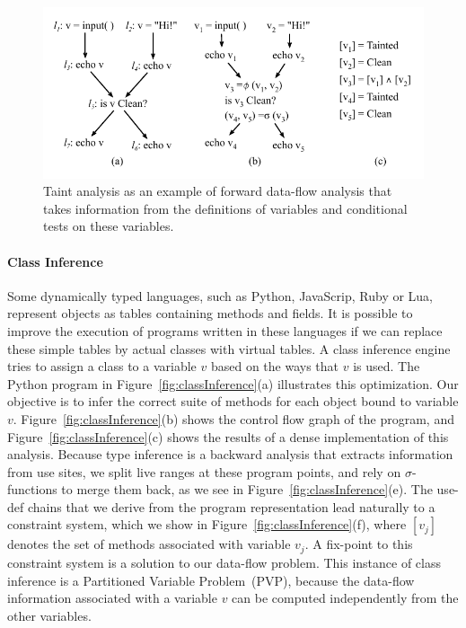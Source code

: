 \begin{figure}[t!]
\centering
\includegraphics[width=\linewidth]{taintAnalysis}
\caption{Taint analysis as an example of forward data-flow analysis that takes information from the definitions of variables and conditional tests on these variables.}
\label{fig:taintAnalysis}
\end{figure}

\paragraph{Class Inference} Some dynamically typed languages, such as Python, Java\-Scrip, Ruby or Lua, represent objects as tables containing methods and fields.
It is possible to improve the execution of programs written in these languages if we can replace these simple tables by actual classes with virtual tables.
A class inference engine tries to assign a class to a variable $v$ based on the ways that $v$ is used.
The Python program in Figure~\ref{fig:classInference}(a) illustrates this optimization.
Our objective is to infer the correct suite of methods for each object bound to variable $v$.
Figure~\ref{fig:classInference}(b) shows the control flow graph of the program, and Figure~\ref{fig:classInference}(c) shows the results of a dense implementation of this analysis.
Because type inference is a backward analysis that extracts information from use sites, we split live ranges at these program points, and rely on $\sigma$-functions to merge them back, as we see in Figure~\ref{fig:classInference}(e).
The use-def chains that we derive from the program representation lead naturally to a constraint system, which we show in Figure~\ref{fig:classInference}(f), where $[v_j]$ denotes the set of methods associated with variable $v_j$.
A fix-point to this constraint system is a solution to our data-flow problem.
This instance of class inference is a Partitioned Variable Problem~(PVP), because the data-flow information associated with a variable $v$ can be computed independently from the other variables.

